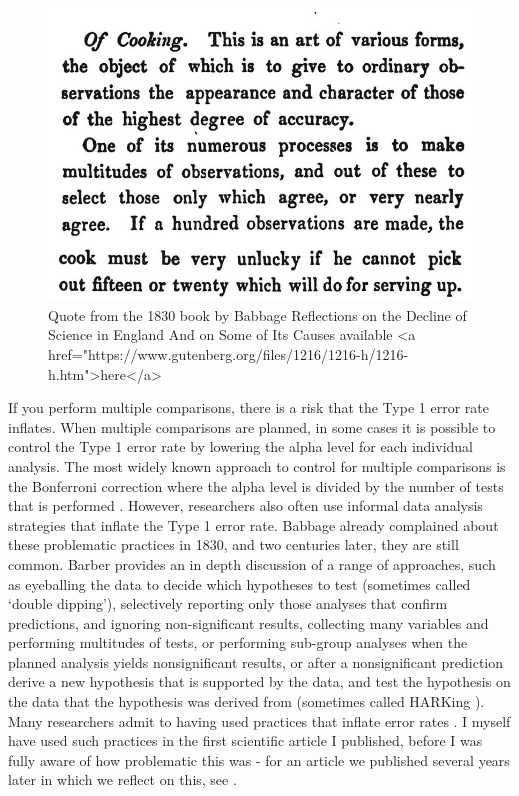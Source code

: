 \documentclass[
  oneside]{book}
\begin{document}
\begin{figure}

{\centering \includegraphics[width=1\linewidth]{images/babbagecooking} 

}

\caption{Quote from the 1830 book by Babbage Reflections on the Decline of Science in England And on Some of Its Causes available <a href="https://www.gutenberg.org/files/1216/1216-h/1216-h.htm">here</a>}\label{fig:cooking}
\end{figure}

If you perform multiple comparisons, there is a risk that the Type 1 error rate inflates. When multiple comparisons are planned, in some cases it is possible to control the Type 1 error rate by lowering the alpha level for each individual analysis. The most widely known approach to control for multiple comparisons is the Bonferroni correction where the alpha level is divided by the number of tests that is performed \citep{dunn_multiple_1961}. However, researchers also often use informal data analysis strategies that inflate the Type 1 error rate. Babbage \citeyearpar{babbage_reflections_1830} already complained about these problematic practices in 1830, and two centuries later, they are still common. Barber \citeyearpar{barber_pitfalls_1976} provides an in depth discussion of a range of approaches, such as eyeballing the data to decide which hypotheses to test (sometimes called `double dipping'), selectively reporting only those analyses that confirm predictions, and ignoring non-significant results, collecting many variables and performing multitudes of tests, or performing sub-group analyses when the planned analysis yields nonsignificant results, or after a nonsignificant prediction derive a new hypothesis that is supported by the data, and test the hypothesis on the data that the hypothesis was derived from (sometimes called HARKing \citep{kerr_harking_1998}). Many researchers admit to having used practices that inflate error rates \citep{fiedler_questionable_2015, john_measuring_2012, van_de_schoot_use_2021, chin_questionable_2021, makel_both_2021}. I myself have used such practices in the first scientific article I published, before I was fully aware of how problematic this was - for an article we published several years later in which we reflect on this, see \citet{jostmann_short_2016}.
\end{document}
